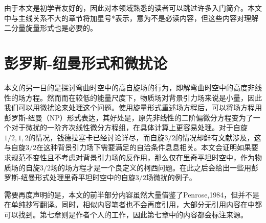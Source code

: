 由于本文是初学者友好的，因此对本领域熟悉的读者可以跳过许多入门简介。本文中与主线关系不大的章节将加星号*表示，意为不是必读内容，但这些内容对理解二分量旋量形式也是必要的。


\section{彭罗斯-纽曼形式和微扰论}

本文的另一目的是探讨弯曲时空中的高自旋场的行为，即解弯曲时空中的高度非线性的场方程。然而而在较低的能量尺度下，物质场对背景引力场来说是小量，因此我们可以用微扰论来处理这个问题。使用旋量形式重述场方程后，可以将场方程用彭罗斯-纽曼（NP）形式表达，其好处是，原先非线性的二阶偏微分方程变为了一个对于微扰的一阶齐次线性微分方程组\parencite{chandrasekhar1998mathematical}，在具体计算上更容易处理。对于自旋$1/2,1,2$的情况，钱德拉塞卡\parencite{chandrasekhar1998mathematical}已经讨论详尽，而自旋$3/2$的情况却鲜有文献涉及，这与自旋$3/2$在这种背景引力场下需要满足的自洽条件息息相关。本文会证明如果要求规范不变性且不考虑对背景引力场的反作用，那么仅在里奇平坦时空中，作为物质场的自旋$3/2$场的场方程才是一个良定义的柯西问题\parencite{frauendiener_spin32_1995}。在此之后会给出一些用彭罗斯-纽曼形式处理里奇平坦时空中的自旋$3/2$场微扰的例子。

需要再度声明的是，本文的前半部分内容虽然大量借鉴了Penrose,1984\parencite{penrose_spinors_1984}，但并不是在单纯抄写翻译。同时，相似内容笔者也不会再度引用，大部分无引用内容在\parencite{penrose_spinors_1984}中都可以找到。第七章则是作者个人的工作，因此第七章中的内容都会标注来源。